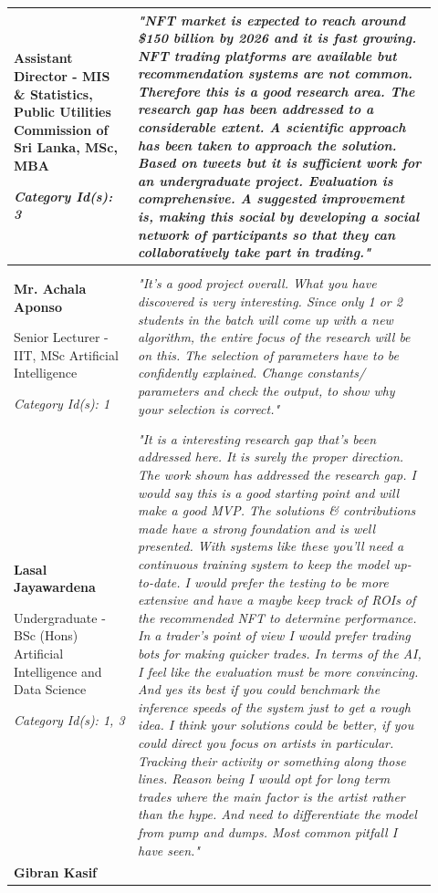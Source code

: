 \begin{longtable}{|p{0.27\linewidth}|p{0.655\linewidth}|}
Assistant Director - MIS \& Statistics, Public Utilities Commission of Sri Lanka, MSc, MBA

\textit{Category Id(s): 3}
& 
 \textit{"NFT market is expected to reach around \$150 billion by 2026 and it is fast growing. NFT trading platforms are available but recommendation systems are not common. Therefore this is a good research area. The research gap has been addressed to a considerable extent. A scientific approach has been taken to approach the solution. Based on tweets but it is sufficient work for an undergraduate project. Evaluation is comprehensive. A suggested improvement is, making this social by developing a social network of participants so that they can collaboratively take part in trading."}
 \\

\hline
\textbf{Mr. Achala Aponso}

Senior Lecturer - IIT, MSc Artificial Intelligence 

\textit{Category Id(s): 1}
 & 
 \textit{"It's a good project overall. What you have discovered is very interesting.
Since only 1 or 2 students in the batch will come up with a new algorithm, the entire focus of the research will be on this.
The selection of parameters have to be confidently explained. Change constants/ parameters and check the output, to show why your selection is correct."}
 \\

\hline
\textbf{Lasal Jayawardena}

Undergraduate - BSc (Hons) Artificial Intelligence and Data Science

\textit{Category Id(s): 1, 3}
 & 
 \textit{"It is a interesting research gap that's been addressed here. It is surely the proper direction. The work shown has addressed the research gap. I would say this is a good starting point and will make a good MVP. The solutions \& contributions made have a strong foundation and is well presented. With systems like these you'll need a continuous training system to keep the model up-to-date. I would prefer the testing to be more extensive and have a maybe keep track of ROIs of the recommended NFT to determine performance.
 In a trader's point of view I would prefer trading bots for making quicker trades. In terms of the AI, I feel like the evaluation must be more convincing. And yes its best if you could benchmark the inference speeds of the system just to get a rough idea. 
I think your solutions could be better, if you could direct you focus on artists in particular. Tracking their activity or something along those lines. Reason being I would opt for long term trades where the main factor is the artist rather than the hype. And need to differentiate the model from pump and dumps. Most common pitfall I have seen."}
 \\
\hline
\textbf{Gibran Kasif}


\end{longtable}
